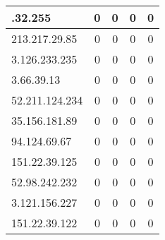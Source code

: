 \documentclass{article}
\begin{document}
\begin{longtable}{|>{\raggedright\arraybackslash}p{3cm}|c|c|c|c|}
    37.72.32.255 & 0 & 0 & 0 & 0 \\
    \hline
    
    
    \rowcolor{lightgreen} %
    
    213.217.29.85 & 0 & 0 & 0 & 0 \\
    \hline
    
    
    \rowcolor{lightgreen} %
    
    3.126.233.235 & 0 & 0 & 0 & 0 \\
    \hline
    
    
    \rowcolor{lightgreen} %
    
    3.66.39.13 & 0 & 0 & 0 & 0 \\
    \hline
    
    
    \rowcolor{lightgreen} %
    
    52.211.124.234 & 0 & 0 & 0 & 0 \\
    \hline
    
    
    \rowcolor{lightgreen} %
    
    35.156.181.89 & 0 & 0 & 0 & 0 \\
    \hline
    
    
    \rowcolor{lightgreen} %
    
    94.124.69.67 & 0 & 0 & 0 & 0 \\
    \hline
    
    
    \rowcolor{lightgreen} %
    
    151.22.39.125 & 0 & 0 & 0 & 0 \\
    \hline
    
    
    \rowcolor{lightgreen} %
    
    52.98.242.232 & 0 & 0 & 0 & 0 \\
    \hline
    
    
    \rowcolor{lightgreen} %
    
    3.121.156.227 & 0 & 0 & 0 & 0 \\
    \hline
    
    
    \rowcolor{lightgreen} %
    
    151.22.39.122 & 0 & 0 & 0 & 0 \\
    \hline
    

\end{longtable}
\end{document}
